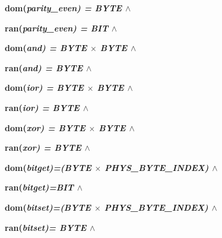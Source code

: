 \hspace*{0.20in}

\hspace*{0.20in}\bf dom\rm (\it parity\_even\rm ) \rm = \it BYTE  $\land$ 

\hspace*{0.20in}\bf ran\rm (\it parity\_even\rm ) \rm = \it BIT  $\land$ 

\hspace*{0.20in}

\hspace*{0.20in}\bf dom\rm (\it and\rm ) \rm = \it BYTE  $\times$  \it BYTE  $\land$ 

\hspace*{0.20in}\bf ran\rm (\it and\rm ) \rm = \it BYTE\hspace*{0.10in} $\land$ 

\hspace*{0.20in}

\hspace*{0.20in}\bf dom\rm (\it ior\rm ) \rm = \it BYTE  $\times$  \it BYTE  $\land$ \hspace*{0.20in}

\hspace*{0.20in}\bf ran\rm (\it ior\rm ) \rm = \it BYTE\hspace*{0.10in} $\land$ 

\hspace*{0.20in}

\hspace*{0.20in}\bf dom\rm (\it xor\rm ) \rm = \it BYTE  $\times$  \it BYTE  $\land$ 

\hspace*{0.20in}\bf ran\rm (\it xor\rm ) \rm = \it BYTE\hspace*{0.10in} $\land$ 

\hspace*{0.20in}

\hspace*{0.20in}\bf dom\rm (\it bitget\rm )\rm =\rm (\it BYTE  $\times$  \it PHYS\_BYTE\_INDEX\rm )  $\land$ 

\hspace*{0.20in}\bf ran\rm (\it bitget\rm )\rm =\it BIT  $\land$ 

\hspace*{0.20in}

\hspace*{0.20in}\bf dom\rm (\it bitset\rm )\rm =\rm (\it BYTE  $\times$  \it PHYS\_BYTE\_INDEX\rm )  $\land$ 

\hspace*{0.20in}\bf ran\rm (\it bitset\rm )\rm = \it BYTE  $\land$ \hspace*{0.15in}

